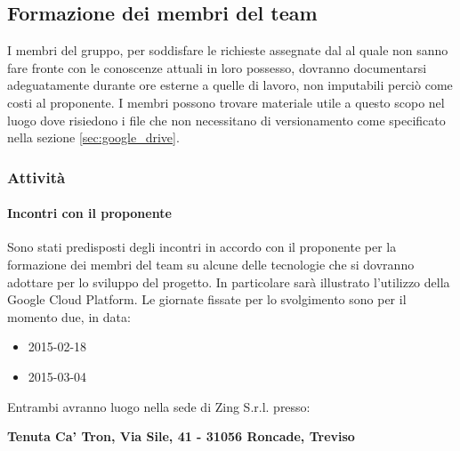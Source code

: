 	\subsection{Formazione dei membri del team}
	I membri del gruppo, per soddisfare le richieste assegnate dal \roleProjectManager{} al quale non sanno fare fronte con le conoscenze attuali in loro possesso, dovranno documentarsi adeguatamente durante ore esterne a quelle di lavoro, non imputabili perciò come costi al proponente.\newline
	I membri possono trovare materiale utile a questo scopo nel luogo dove risiedono i file che non necessitano di versionamento come specificato nella sezione \ref{sec:google_drive}.
		\subsubsection{Attività} %
			\paragraph{Incontri con il proponente} %
			\label{par:incontri_con_il_proponente}
			Sono stati predisposti degli incontri in accordo con il proponente per la formazione dei membri del team su alcune delle tecnologie che si dovranno adottare per lo sviluppo del progetto. In particolare sarà illustrato l'utilizzo della Google Cloud Platform. \newline
			Le giornate fissate per lo svolgimento sono per il momento due, in data:
				\begin{itemize}
					\item 2015-02-18
					\item 2015-03-04
				\end{itemize}
			\noindent
			Entrambi avranno luogo nella sede di Zing S.r.l. presso:
			\begin{center}
				\textbf{Tenuta Ca’ Tron, Via Sile, 41 - 31056 Roncade, Treviso}
			\end{center}

